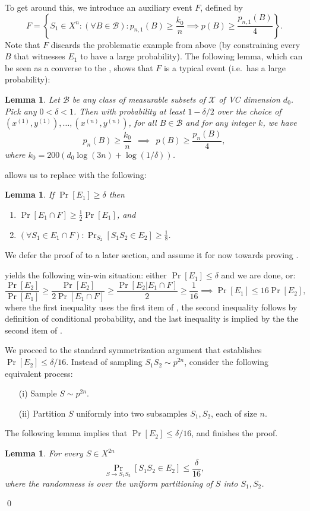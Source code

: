 \documentclass{article}
\def\X{{\mathcal X}}
\def\B{{\mathcal B}}
\newtheorem{lemma}[theorem]{Lemma}
\newcommand{\comment}[3]{}  %
\newcommand{\shay}[1]{\comment{purple}{Shay}{#1}}
\begin{document}
To get around this, we introduce an auxiliary event $F$, defined by
\[F = \left\{S_1\in X^{n} : (\forall B\in\B): p_{n,1}(B) \geq \frac{k_0}{n} \implies p(B)\geq \frac{p_{n,1}(B)}{4}\right\}. \]
Note that $F$ discards the problematic example from above 
(by constraining every $B$ that witnesses $E_1$ to have a large probability). 
The following lemma, which can be seen as a converse to the , 
shows that $F$ is a typical event (i.e.\ has a large probability):
\shay{Maybe move this lemma to after \Cref{lemma:points-in-balls}}
\begin{lemma}\label{lem:Fistypical}
Let $\B$ be any class of measurable subsets of $\X$ of VC dimension $d_0$. Pick any $0 < \delta < 1$. Then with probability at least $1-\delta/2$ over the choice of $(x^{(1)}, y^{(1)}), \ldots, (x^{(n)}, y^{(n)})$, for all $B \in \B$ and for any integer $k$, we have
\[ p_n(B) \geq \frac{k_0}{n}
\ \ \implies \ \ 
p(B) \geq \frac{p_n(B)}{4},\]
where $k_0 = 200 \left(d_0 \log(3n) + \log(1/\delta)\right)$.
\end{lemma}

 allows us to replace  with the following:
\begin{lemma}\label{lem:reduction}
If $\Pr[E_1]\geq \delta$ then 
\begin{enumerate}
\item $\Pr[E_1\cap F] \geq \frac{1}{2}\Pr[E_1]$, and
\item $(\forall S_1\in E_1\cap F): \Pr_{S_2}[S_1S_2\in E_2] \geq \frac{1}{8}$. 
\end{enumerate}
\end{lemma}
We defer the proof of  to a later section, 
and assume it for now towards proving .

 yields the following win-win situation:
either $\Pr[E_1] \leq \delta$ and we are done, or:
\[\frac{\Pr[E_2]}{\Pr[E_1]} \geq  \frac{\Pr[E_2]}{2\Pr[E_1\cap F]} \geq \frac{\Pr[E_2 \vert E_1\cap F]}{2} \geq \frac{1}{16}
\implies  \Pr[E_1]\leq 16\Pr[E_2],\]
where the first inequality uses the first item of , 
the second inequality follows by definition of conditional probability,
and the last inequality is implied by the the second item of .


We proceed to the standard symmetrization argument
that establishes $\Pr[E_2]\leq\delta/16$. 
Instead of sampling $S_1S_2\sim p^{2n}$,
consider the following equivalent process:
\begin{itemize}
\item[(i)] Sample $S\sim p^{2n}$.
\item[(ii)] Partition $S$ uniformly into two subsamples $S_1,S_2$, each of size $n$.
\end{itemize}
The following lemma implies that $\Pr[E_2]\leq \delta/16$, and finishes the proof.
\begin{lemma}\label{lem:e2}
For every $S\in X^{2n}$
\[\Pr_{S\to S_1S_2}\left[S_1S_2\in E_2\right]\leq \frac{\delta}{16},\]
where the randomness is over the uniform partitioning
of $S$ into $S_1,S_2$.
\end{lemma}
\qed
\end{document}
